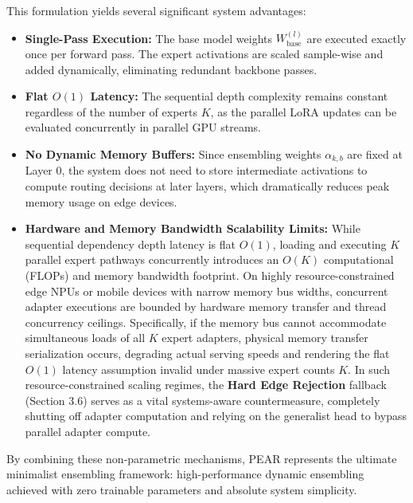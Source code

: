 This formulation yields several significant system advantages:
\begin{itemize}
    \item \textbf{Single-Pass Execution:} The base model weights $W_{\text{base}}^{(l)}$ are executed exactly once per forward pass. The expert activations are scaled sample-wise and added dynamically, eliminating redundant backbone passes.
    \item \textbf{Flat $O(1)$ Latency:} The sequential depth complexity remains constant regardless of the number of experts $K$, as the parallel LoRA updates can be evaluated concurrently in parallel GPU streams.
    \item \textbf{No Dynamic Memory Buffers:} Since ensembling weights $\alpha_{k, b}$ are fixed at Layer 0, the system does not need to store intermediate activations to compute routing decisions at later layers, which dramatically reduces peak memory usage on edge devices.
    \item \textbf{Hardware and Memory Bandwidth Scalability Limits:} While sequential dependency depth latency is flat $O(1)$, loading and executing $K$ parallel expert pathways concurrently introduces an $O(K)$ computational (FLOPs) and memory bandwidth footprint. On highly resource-constrained edge NPUs or mobile devices with narrow memory bus widths, concurrent adapter executions are bounded by hardware memory transfer and thread concurrency ceilings. Specifically, if the memory bus cannot accommodate simultaneous loads of all $K$ expert adapters, physical memory transfer serialization occurs, degrading actual serving speeds and rendering the flat $O(1)$ latency assumption invalid under massive expert counts $K$. In such resource-constrained scaling regimes, the \textbf{Hard Edge Rejection} fallback (Section 3.6) serves as a vital systems-aware countermeasure, completely shutting off adapter computation and relying on the generalist head to bypass parallel adapter compute.
\end{itemize}
By combining these non-parametric mechanisms, PEAR represents the ultimate minimalist ensembling framework: high-performance dynamic ensembling achieved with zero trainable parameters and absolute system simplicity.
